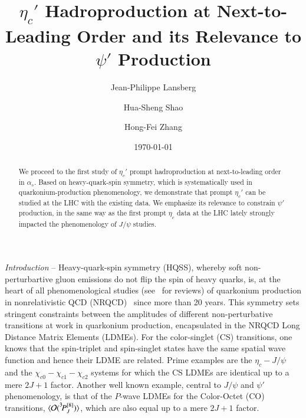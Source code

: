 \documentclass[showpacs,aps,PRL,twocolumn,footinbib,11]{revtex4-1}
\def\tPJe{{\bigl.^3\!P^{[8]}_J}}
\def\jpsi{J/\psi}
\def\psip{\psi'}
\def\etac{\eta_c}
\def\etacp{\eta_c'}
\begin{document}
\title{$\etacp$ Hadroproduction at Next-to-Leading Order and its Relevance to 
$\psi'$ Production}

\author{Jean-Philippe Lansberg}

\author{Hua-Sheng Shao}

\author{Hong-Fei Zhang}

\date{\today}

\begin{abstract}
We proceed to the first study of $\etacp$ prompt hadroproduction at next-to-leading order in $\alpha_s$.
Based on heavy-quark-spin symmetry, which is systematically used in  quarkonium-production
phenomenology, we demonstrate that prompt $\etacp$ can be studied at the LHC with the existing data. We emphasize
its relevance to constrain $\psi'$ production, in the same way as the first prompt $\etac$ data at the LHC
lately strongly impacted the phenomenology of $J/\psi$ studies. 
\end{abstract}

\maketitle

\textit{Introduction} -- 
%
Heavy-quark-spin symmetry (HQSS), whereby soft non-perturbartive 
gluon emissions do not flip the spin of heavy quarks, is, at
the heart of all phenomenological studies (see~\cite{Lansberg:2006dh,Brambilla:2010cs,Andronic:2015wma} for reviews) of quarkonium production in nonrelativistic QCD 
(NRQCD)~\cite{Bodwin:1994jh} since more than 20 years.
This symmetry sets stringent constraints between the amplitudes 
of different non-perturbative transitions at work in quarkonium production,
encapsulated in the NRQCD Long Distance Matrix Elements (LDMEs). 
For the color-singlet (CS) transitions, one knows that the spin-triplet and spin-singlet states
have the same spatial wave function and hence their LDME are related. Prime examples
are the $\etac -
 \jpsi$ and the $\chi_{c0}-\chi_{c1}-\chi_{c2}$ systems for which the CS  LDMEs
are identical up to a mere $2J+1$ 
factor. Another well known example, central
to $J/\psi$ and $\psip$ phenomenology, 
is that of the $P$-wave LDMEs for the Color-Octet (CO) transitions, $\langle {\cal O}(\tPJe) \rangle$, 
which are also equal up to a mere $2J+1$ factor.
\end{document}
